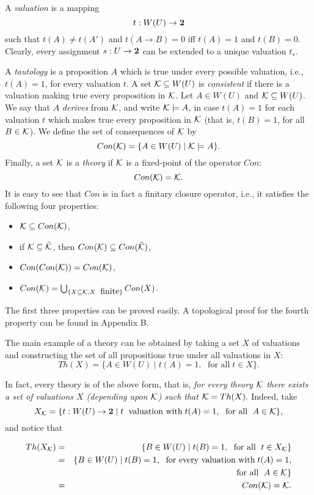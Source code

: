 A {\it valuation} is a mapping
\[t: W(U)  \rightarrow {\bf 2}\]
such that $t(A) \not= t(A')$ and $t(A \rightarrow B) = 0$ iff $t(A)=1$ and
$t(B)=0$.
Clearly, every assignment $s: U \rightarrow {\bf 2}$ can be extended to a
unique valuation $t_s$.

A {\it tautology} is a proposition $A$ which is true under every possible
valuation,
i.e., $t(A)=1$, for every valuation $t$. A set $ {\cal K} \subseteq W(U)$
is {\it consistent} if there is a valuation making true every proposition
in $\cal {K}$. Let $A\in W(U)$ and ${\cal K} \subseteq W(U)$.
We say that $A$ {\it derives} from $ {{\cal K}}$, and write
${\cal K}\models A$, in case  $t(A)=1$ for each valuation $t$ which makes
true every proposition in
${\cal K} $ (that is, $t(B)=1$, for all $B\in {\cal K}$).
We define the set of consequences of ${\cal K}$ by
\[Con({\cal K}) = \{A\in W(U) \mid {\cal K}\models A\}.\]
Finally, a set ${\cal K}$ is a {\it theory} if ${\cal K}$ is a fixed-point
of the operator
$Con$:
\[Con({\cal K}) = {\cal K}.\]
 It is easy to see that $Con$ is in fact a finitary closure operator, i.e.,
it satisfies the
following four properties:
\begin{itemize}
\item ${\cal K} \subseteq Con({\cal K})$,
\item if $ {\cal K} \subseteq \tilde{\cal K}$, then
         $Con({\cal K})\subseteq Con(\tilde{\cal K})$,
\item $Con(Con({\cal K})) = Con({\cal K})$,
\item $Con({\cal K}) = \bigcup_{\{X\subseteq {\cal K}, X \;\mbox{
finite}\}} Con(X)$.
\end{itemize}
The first three properties can be proved easily. A topological proof for
the fourth property can be found in Appendix B.

The main example of a theory can be obtained by taking a set $X$ of valuations
and constructing the set of all propositions true under all valuations in $X$:
\[Th(X) = \{ A\in W(U)\mid t(A)=1, \; \mbox{ for all} \; t\in X\}.\]

In fact, every theory is of the above form, that is, {\it for every theory
${\cal K}$ there exists a set of valuations $X$ (depending upon ${\cal K}$)
 such that ${\cal K} = Th(X).$ }  Indeed, take
\[X_{{\cal K}} = \{ t: W(U) \rightarrow {\bf 2} \mid t \; \mbox{ valuation
with} \;
t(A)=1,\; \mbox{ for all }\; A\in {\cal K}\},\]
and notice that

\begin{eqnarray*}
Th(X_{{\cal K}}) & = & \{B\in W(U)\mid t(B)=1,\; \mbox{ for all }\; t\in
X_{{\cal K}}\}\\
& = & \{ B\in W(U)\mid t(B)=1,\; \mbox{ for every valuation with}\; t(A)=1,\\
&    &  \mbox{ for all }\; A\in {\cal K}\}\\
& = & Con({\cal K}) = {\cal K}.
\end{eqnarray*}

